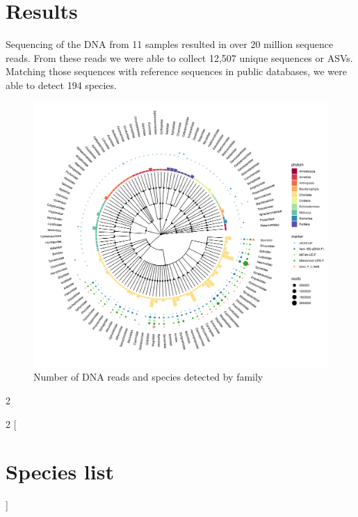 \documentclass[10pt]{article}
\begin{document}
\section{Results}

Sequencing of the DNA from 11 samples resulted in over 20 million sequence reads. From these reads we were able to collect 12,507 unique sequences or ASVs. Matching those sequences with reference sequences in public databases, we were able to detect 194 species.






\begin{figure}[h!]
\centering
\includegraphics[width=\textwidth]{tree}
\caption{Number of DNA reads and species detected by family}
\end{figure}

\begin{multicols}{2}
\blindtext
\blindtext
\end{multicols}

\clearpage

\begin{multicols}{2}
[\section{Species list}]
\end{multicols}


\end{document}
